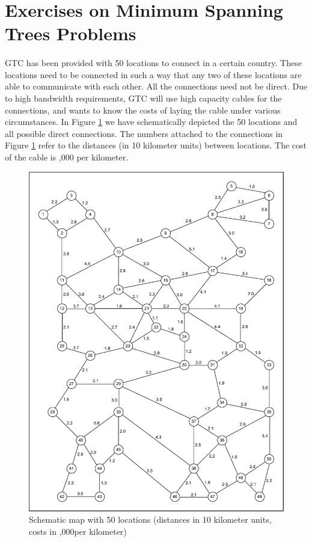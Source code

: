 \section{Exercises on Minimum Spanning Trees Problems}

\paragraph{}
	GTC has been provided with 50 locations to connect in a certain country. These locations need
to be connected in such a way that any two of these locations are able to communicate
with each other. All the connections need not be direct. Due to high bandwidth
requirements, GTC will use high capacity cables for the connections, and wants to
know the costs of laying the cable under various circumstances. In Figure \ref{graph2-1} we
have schematically depicted the 50 locations and all possible direct connections. The
numbers attached to the connections in Figure \ref{graph2-1} refer to the distances (in 10 kilometer
units) between locations. The cost of the cable is ,000 per kilometer.

\begin{figure}[H]
	\centering
	\includegraphics[scale=0.5]{./img/graph2-1.png}
	\caption{Schematic map with 50 locations (distances in 10 kilometer units, costs in ,000per kilometer)}
	\label{graph2-1}
\end{figure}

